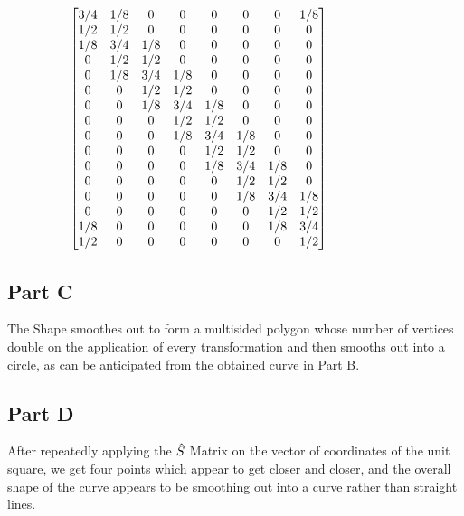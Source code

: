 \documentclass[12pt,a4paper]{article}
\begin{document}
\[ \hspace{-2cm}
 \begin{bmatrix} 
    3/4 & 1/8 & 0  & 0& 0 & 0 & 0 & 1/8 \\
    1/2 & 1/2 & 0 & 0 & 0 & 0 & 0 & 0\\
    1/8 & 3/4 & 1/8 & 0 & 0& 0 & 0 & 0\\
    0& 1/2 & 1/2 & 0 & 0 & 0 & 0 & 0\\
    0 & 1/8 & 3/4 & 1/8 & 0 & 0& 0 & 0\\
    0 & 0 & 1/2 & 1/2 & 0 & 0 & 0 & 0\\
    0 & 0 & 1/8 & 3/4 & 1/8 & 0 & 0& 0 \\
    0 & 0 & 0 & 1/2 & 1/2 & 0 & 0 & 0\\
    0 & 0 & 0 & 1/8 & 3/4 & 1/8 & 0 & 0\\
    0 & 0 & 0 & 0 & 1/2 & 1/2 & 0 & 0\\
    0 & 0 & 0 & 0 & 1/8 & 3/4 & 1/8 & 0 \\
    0 & 0 & 0 & 0 & 0 & 1/2 & 1/2 & 0\\
    0 & 0 & 0 & 0 & 0 & 1/8 & 3/4 & 1/8\\
    0 & 0 & 0 & 0 & 0 & 0 & 1/2 & 1/2\\
    1/8 & 0 & 0 & 0 & 0 & 0 & 1/8 & 3/4\\
    1/2 & 0 & 0 & 0 & 0 & 0 & 0 & 1/2\\
\end{bmatrix}
 \]
\subsection{Part C}

The Shape smoothes out to form a multisided polygon whose number of vertices double on the application of every transformation and then smooths out into a circle, as can be anticipated from the obtained curve in Part B.

\subsection{Part D}

After repeatedly applying the $\Hat{S}$ Matrix on the vector of coordinates of the unit square, we get four points which appear to get closer and closer, and the overall shape of the curve appears to be smoothing out into a curve rather than straight lines.
\end{document}

